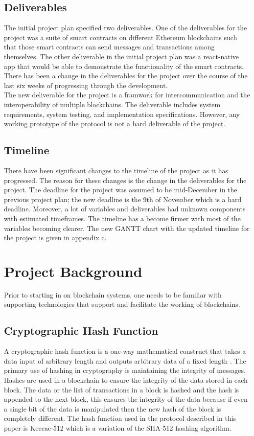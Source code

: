 \documentclass[a4paper,twoside,phd]{BYUPhys}
\begin{document}
\subsection{Deliverables}
The initial project plan specified two deliverables. One of the deliverables for the project was a suite of smart contracts on different Ethereum blockchains such that those smart contracts can send messages and transactions among themselves. The other deliverable in the initial project plan was a react-native app that would be able to demonstrate the functionality of the smart contracts. There has been a change in the deliverables for the project over the course of the last six weeks of progressing through the development. 
\\

The new deliverable for the project is a framwork for intercommunication and the interoperability of multiple blockchains. The deliverable includes system requirements, system testing, and implementation specifications. However, any working prototype of the protocol is not a hard deliverable of the project.
\subsection{Timeline}
There have been significant changes to the timeline of the project as it has progressed. The reason for these changes is the change in the deliverables for the project. The deadline for the project was assumed to be mid-December in the previous project plan; the new deadline is the 9th of November which is a hard deadline. Moreover, a lot of variables and deliverables had unknown components with estimated timeframes. The timeline has a become firmer with most of the variables becoming clearer. The new GANTT chart with the updated timeline for the project is given in appendix c.
\section{Project Background}
Prior to starting in on blockchain systems, one needs to be familiar with supporting technologies that support and facilitate the working of blockchains. 
\subsection{Cryptographic Hash Function}
A cryptographic hash function is a one-way mathematical construct that takes a data input of arbitrary length and outputs arbitrary data of a fixed length \cite{}. The primary use of hashing in cryptography is maintaining the integrity of messages. Hashes are used in a blockchain to ensure the integrity of the data stored in each block. The data or the list of transactions in a block is hashed and the hash is appended to the next block, this ensures the integrity of the data because if even a single bit of the data is manipulated then the new hash of the block is completely different. The hash function used in the protocol described in this paper is Keccac-512 which is a variation of the SHA-512 hashing algorithm\cite{}. 
\end{document}
